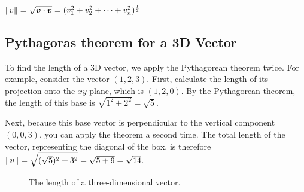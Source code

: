 \begin{definition}
  \label{def:vector_length}
  $\lVert v\rVert=\sqrt{\bm{v}\cdot\bm{v}}=(v_1^2+v_2^2+\cdots+v_n^2)^{\frac{1}{2}}$\end{definition}
\subsection{Pythagoras theorem for a 3D Vector}

To find the length of a 3D vector, we apply the Pythagorean theorem twice. For example, consider the vector
\((1,2,3)\). First, calculate the length of its projection onto the \(xy\)-plane, which is \((1,2,0)\). By the
Pythagorean theorem, the length of this base is \(\sqrt{1^2 + 2^2} = \sqrt{5}\).

Next, because this base vector is perpendicular to the vertical component \((0,0,3)\), you can apply the theorem a
second time. The total length of the vector, representing the diagonal of the box, is therefore \(\lVert\bm{v}\rVert =
\sqrt{(\sqrt{5})^2 + 3^2} = \sqrt{5+9} = \sqrt{14}\).

\begin{figure}[H]
  \caption{The length of a three-dimensional vector.}
\end{figure}

